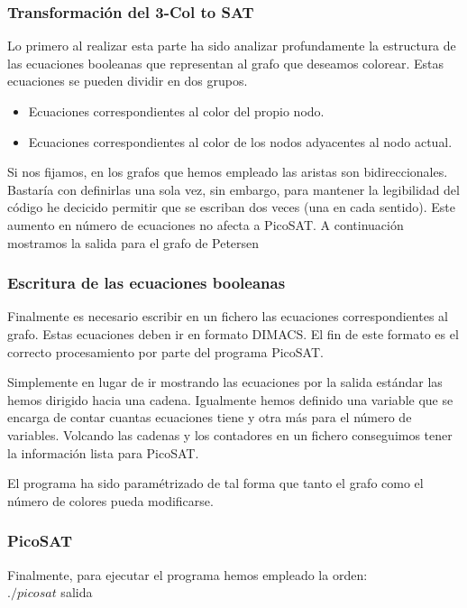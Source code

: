 \documentclass{article}
\begin{document}
    \subsubsection{Transformación del 3-Col to SAT}
        Lo primero al realizar esta parte ha sido analizar profundamente la estructura de las ecuaciones booleanas que 
        representan al grafo que deseamos colorear.
        Estas ecuaciones se pueden dividir en dos grupos.
        \begin{itemize}
            \item Ecuaciones correspondientes al color del propio nodo.
            \item Ecuaciones correspondientes al color de los nodos adyacentes al nodo actual.
        \end{itemize}
        Si nos fijamos, en los grafos que hemos empleado las aristas son bidireccionales. Bastaría con definirlas una sola vez, 
        sin embargo, para mantener la legibilidad del código he decicido permitir que se escriban dos veces (una en cada sentido).
        Este aumento en número de ecuaciones no afecta a PicoSAT. A continuación mostramos la salida para el grafo de Petersen 
    
    \subsubsection{Escritura de las ecuaciones booleanas}
        Finalmente es necesario escribir en un fichero las ecuaciones correspondientes al grafo. Estas 
        ecuaciones deben ir en formato DIMACS. El fin de este formato es el correcto procesamiento por parte del 
        programa PicoSAT. 

        Simplemente en lugar de ir mostrando las ecuaciones por la salida estándar las hemos dirigido hacia una cadena. Igualmente 
        hemos definido una variable que se encarga de contar cuantas ecuaciones tiene y otra más para el número de variables. 
        Volcando las cadenas y los contadores en un fichero conseguimos tener la información lista para PicoSAT.

        El programa ha sido paramétrizado de tal forma que tanto el grafo como el número de colores pueda modificarse.  
    
    \subsubsection{PicoSAT}
        Finalmente, para ejecutar el programa hemos empleado la orden: \\
         \vspace{5mm} $./picosat$ salida \\
\end{document}
